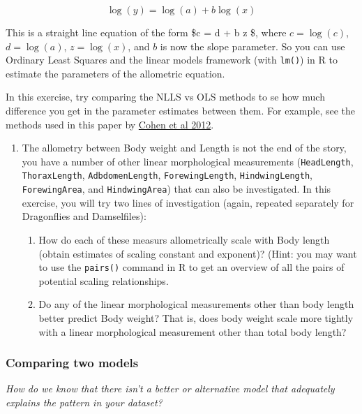\documentclass[11pt]{article}
\begin{document}
\[
\log(y) = \log(a) + b \log(x)
\]

This is a straight line equation of the form \$c = d + b z \$, where
\(c = \log(c)\), \(d = \log(a)\), \(z = \log(x)\), and \(b\) is now the
slope parameter. So you can use Ordinary Least Squares and the linear
models framework (with \texttt{lm()}) in R to estimate the parameters of
the allometric equation.

In this exercise, try comparing the NLLS vs OLS methods to se how much
difference you get in the parameter estimates between them. For example,
see the methods used in this paper by
\href{https://www.ncbi.nlm.nih.gov/pmc/articles/PMC3465447/}{Cohen et al
2012}.

\begin{enumerate}
\def\labelenumi{(\alph{enumi})}
\setcounter{enumi}{4}
\item
  The allometry between Body weight and Length is not the end of the
  story, you have a number of other linear morphological measurements
  (\texttt{HeadLength}, \texttt{ThoraxLength}, \texttt{AdbdomenLength},
  \texttt{ForewingLength}, \texttt{HindwingLength},
  \texttt{ForewingArea}, and \texttt{HindwingArea}) that can also be
  investigated. In this exercise, you will try two lines of
  investigation (again, repeated separately for Dragonflies and
  Damselfiles):

  \begin{enumerate}
  \def\labelenumii{(\roman{enumii})}
  \item
    How do each of these measurs allometrically scale with Body length
    (obtain estimates of scaling constant and exponent)? (Hint: you may
    want to use the \texttt{pairs()} command in R to get an overview of
    all the pairs of potential scaling relationships.
  \item
    Do any of the linear morphological measurements other than body
    length better predict Body weight? That is, does body weight scale
    more tightly with a linear morphological measurement other than
    total body length?
  \end{enumerate}
\end{enumerate}

    \subsubsection{Comparing two models}\label{comparing-two-models}

\emph{How do we know that there isn't a better or alternative model that
adequately explains the pattern in your dataset?}
\end{document}
